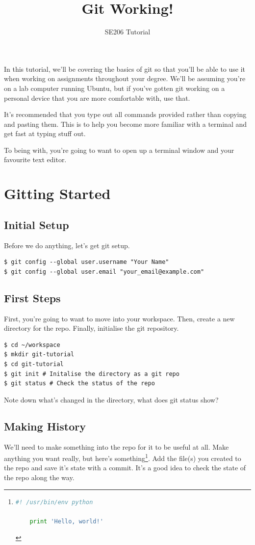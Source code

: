 \documentclass{tufte-handout}
\title{Git Working!}
\author{SE206 Tutorial}
\begin{document}
\maketitle

\noindent In this tutorial, we'll be covering the basics of git so that you'll be able to use it when working on assignments throughout your degree. We'll be assuming you're on a lab computer running Ubuntu, but if you've gotten git working on a personal device that you are more comfortable with, use that.

\noindent It's recommended that you type out all commands provided rather than copying and pasting them. This is to help you become more familiar with a terminal and get fast at typing stuff out.

\noindent To being with, you're going to want to open up a terminal window and your favourite text editor.

\section{Gitting Started}
\subsection{Initial Setup}

Before we do anything, let's get git setup.

\begin{lstlisting}
$ git config --global user.username "Your Name"
$ git config --global user.email "your_email@example.com"
\end{lstlisting}

\subsection{First Steps}

First, you're going to want to move into your workspace. Then, create a new directory for the repo. Finally, initialise the git repository.

\begin{lstlisting}
$ cd ~/workspace
$ mkdir git-tutorial
$ cd git-tutorial
$ git init # Initalise the directory as a git repo
$ git status # Check the status of the repo
\end{lstlisting}

\noindent Note down what's changed in the directory, what does git status show?

\subsection{Making History}
We'll need to make something into the repo for it to be useful at all. Make anything you want really, but here's something\cprotect\footnote{
	\begin{lstlisting}[language=Python]
	#! /usr/bin/env python

	print 'Hello, world!'
	\end{lstlisting}
}.
Add the file(s) you created to the repo and save it's state with a commit. It's a good idea to check the state of the repo along the way.
\end{document}
